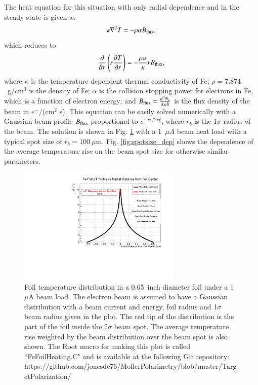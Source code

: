 \documentclass[preprint,12pt]{elsarticle}
\begin{document}
The heat equation for this situation with only radial dependence and in the steady state is given as
\begin{equation}
\kappa\nabla^2T=-\rho\alpha B_{\rm flux},
\end{equation}
which reduces to
\begin{equation}
\label{eq:heat_T_r}
\frac{\partial}{\partial r}\left(r\frac{\partial T}{\partial r}\right)=-\frac{\rho\alpha}{\kappa}rB_{\rm flux},
\end{equation}
where $\kappa$ is the temperature dependent thermal conductivity of Fe; $\rho =7.874$~g/cm$^3$ is the density of Fe; $\alpha$ is the collision stopping power for electrons in Fe, which is a function of electron energy; and $B_{\rm flux}=\frac{d^3N_e}{ds dt} $ is the flux density of the beam in $e^-$/(cm$^2$ s). This equation can be easily solved numerically with a Gaussian beam profile $B_{\rm flux}$ proportional to $e^{-r^2/2r_b^2}$, where $r_{b}$ is the 1$\sigma$ radius of the beam. The solution is shown in Fig. \ref{fig:target_heating} with a 1~$\mu A$ beam heat load with a typical spot size of $r_{b}=100~\mu$m. Fig. \ref{fig:spotsize_dep} shows the dependence of the average temperature rise on the beam spot size for otherwise similar parameters.
\begin{figure}[ht]
\centering
\includegraphics[width=0.7\textwidth]{FeFoilHeatingdT.pdf}
\caption{Foil temperature distribution in a 0.65~inch diameter foil under a 1~$\mu$A beam load. The electron beam is assumed to have a Gaussian distribution with a beam current and energy, foil radius and 1$\sigma$ beam radius given in the plot. The red tip of the distribution is the part of the foil inside the 2$\sigma$ beam spot. The  average temperature rise weighted by the beam distribution over the beam spot is also shown. The {\sc Root} macro for making this plot is called ``FeFoilHeating.C" and is available at the following Git repository: https://github.com/jonesdc76/MollerPolarimetry/blob/master/TargetPolarization/}
\label{fig:target_heating}
\end{figure}
\end{document}
